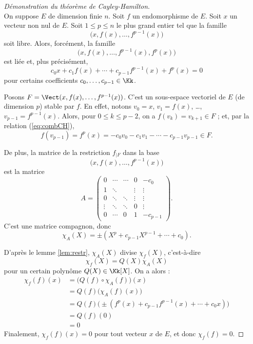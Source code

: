 \documentclass[12pt, class=report,crop=false]{standalone}
\begin{document}
\begin{proof}[Démonstration du théorème de Cayley-Hamilton]~\\
On suppose $E$ de dimension finie $n$.
Soit $f$ un endomorphisme de $E$. Soit $x$ un vecteur non nul de $E$. 
Soit $1 \le p \le n$ le plus grand entier tel que la famille
\[\big( x, f(x),\ldots,f^{p-1}(x) \big)\]
soit libre. Alors, forcément, la famille 
\[\big( x, f(x),\ldots,f^{p-1}(x),f^{p}(x) \big)\]
est liée et, plus précisément,  
\begin{equation}
\label{eq:combCH}
c_0x + c_1 f(x) + \cdots +c_{p-1}f^{p-1}(x) + f^p(x) =0
\end{equation}
pour certains coefficients $c_0,\ldots, c_{p-1}\in \Kk$.

Posons $F  = \Vect( x, f(x),\ldots,f^{p-1}(x) )$. 
C'est un sous-espace vectoriel de $E$ (de dimension $p$) stable par $f$. 
En effet, notons $v_0 = x$, $v_1 = f(x)$, \ldots, $v_{p-1} = f^{p-1}(x)$.
Alors, pour $0 \le k \le p-2$, on a $f(v_k) = v_{k+1} \in F$ ;
et, par la relation (\ref{eq:combCH}), 
$$f(v_{p-1}) = f^p(x) = -c_0 v_0 - c_1v_1 - \cdots - c_{p-1}v_{p-1} \in F.$$

De plus, la matrice de la restriction $f_{|F}$ dans la base 
\[\big(x, f(x),\ldots,f^{p-1}(x)\big)\]
est la matrice
\[A = 
\begin{pmatrix}
0&\cdots&\cdots&0&-c_{0}\\
1&\ddots&&\vdots&\vdots\\
0&\ddots&\ddots&\vdots&\vdots\\
\vdots&\ddots&\ddots&0&\vdots\\
0&\cdots&0&1&-c_{p-1}
\end{pmatrix}.\]
C'est une matrice compagnon, donc
\[\chi_A(X)= \pm(X^p + c_{p-1}X^{p-1}+\cdots+c_0) .\]


D'après le lemme \ref{lem:restr}, $\chi_A(X)$ divise $\chi_f(X)$, c'est-à-dire
\[\chi_f(X)= Q(X)\chi_A(X)\]
pour un certain polynôme $Q(X) \in \Kk[X]$. On a alors :
\begin{align*}
\chi_f(f)(x)
  &= \big(Q(f) \circ \chi_A(f)\big) (x) \\
  &= Q(f) \big( \chi_A(f) (x) \big) \\
  &= Q(f) \big( \pm(f^p(x)+c_{p-1}f^{p-1}(x)+\cdots+c_0x)\big) \\
  &= Q(f)(0) \\
  &= 0
\end{align*}
Finalement, $\chi_f(f)(x)=0$ pour tout vecteur $x$ de $E$, et donc $\chi_f(f)=0$.
\end{proof}
\end{document}
